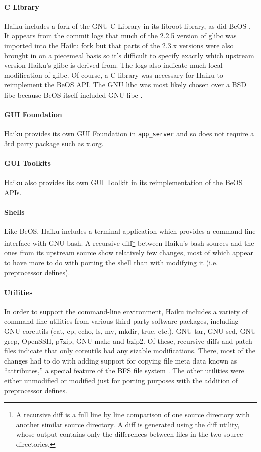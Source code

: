\documentclass{article}
\begin{document}
\paragraph{C Library}
Haiku includes a fork of the GNU C Library in its libroot library, as
did BeOS \cite{GlibCWiki}.  It appears from the commit logs that much
of the 2.2.5 version of glibc was imported into the Haiku fork
\cite{HaikuLibrootGlibcOld} but that parts of the 2.3.x versions were
also brought in on a piecemeal basis \cite{HaikuLibrootGlibcRecent} so
it's difficult to specify exactly which upstream version Haiku's glibc
is derived from.  The logs also indicate much local modification of
glibc.  Of course, a C library was necessary for Haiku to reimplement
the BeOS API.  The GNU libc was most likely chosen over a BSD libc
because BeOS itself included GNU libc \cite{GlibCWiki}.

\paragraph{GUI Foundation}
Haiku provides its own GUI Foundation in \texttt{app\_server} and so
does not require a 3rd party package such as x.org.

\paragraph{GUI Toolkits}
Haiku also provides its own GUI Toolkit in its reimplementation of the
BeOS APIs.

\paragraph{Shells}
Like BeOS, Haiku includes a terminal application which provides a
command-line interface with GNU bash.  A recursive diff\footnote{A
recursive diff is a full line by line comparison of one source
directory with another similar source directory.  A diff is generated
using the diff utility, whose output contains only the differences
between files in the two source directories.} between Haiku's bash
sources and the ones from its upstream source show relatively few
changes, most of which appear to have more to do with porting the
shell than with modifying it (i.e. preprocessor defines).

\paragraph{Utilities}
In order to support the command-line environment, Haiku includes a
variety of command-line utilities from various third party software
packages, including GNU coreutils (cat, cp, echo, ls, mv, mkdir, true,
etc.), GNU tar, GNU sed, GNU grep, OpenSSH, p7zip, GNU make and bzip2.
Of these, recursive diffs and patch files \cite{HaikuR1A3Src} indicate
that only coreutils had any sizable modifications.  There, most of the
changes had to do with adding support for copying file meta data known
as ``attributes,'' a special feature of the BFS file system
\cite{BFSWiki}.  The other utilities were either unmodified or
modified just for porting purposes with the addition of preprocessor
defines.
\end{document}
